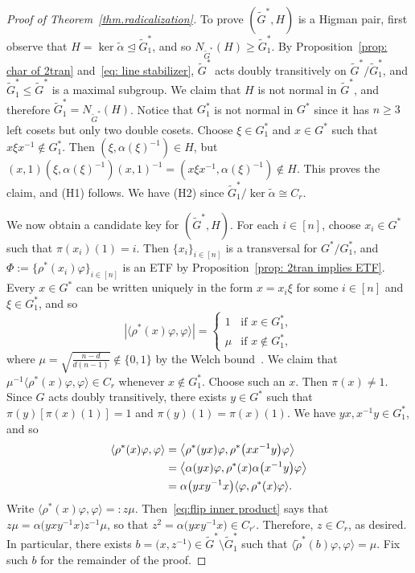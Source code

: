 \begin{proof}[Proof of Theorem~\ref{thm.radicalization}]
To prove $(\widetilde{G}^*, H)$ is a Higman pair, first observe that $H = \ker \widetilde{\alpha} \trianglelefteq \widetilde{G}_1^*$, and so $N_{\widetilde{G}^*}(H) \geq \widetilde{G}_1^*$.
By Proposition~\ref{prop: char of 2tran} and~\eqref{eq: line stabilizer}, $\widetilde{G}^*$ acts doubly transitively on $\widetilde{G}^*/\widetilde{G}_1^*$, and $\widetilde{G}_1^*\leq \widetilde{G}^*$ is a maximal subgroup.
We claim that $H$ is not normal in $\widetilde{G}^*$, and therefore $\widetilde{G}_1^* = N_{\widetilde{G}^*}(H)$.
Notice that $G_1^*$ is not normal in $G^*$ since it has $n\geq 3$ left cosets but only two double cosets.
Choose $\xi \in G_1^*$ and $x \in G^*$ such that $x\xi x^{-1} \notin G_1^*$.
Then $(\xi,\alpha(\xi)^{-1}) \in H$, but $(x,1)(\xi,\alpha(\xi)^{-1})(x,1)^{-1} = (x\xi x^{-1},\alpha(\xi)^{-1}) \notin H$.
This proves the claim, and (H1) follows.
We have (H2) since $\widetilde{G}_1^*/\ker \widetilde{\alpha} \cong C_r$.

We now obtain a candidate key for $(\widetilde{G}^*, H)$.
For each $i \in [n]$, choose $x_i \in G^*$ such that $\pi(x_i)(1) = i$.
Then $\{ x_i \}_{i \in [n]}$ is a transversal for $G^* / G_1^*$, and $\Phi := \{ \rho^*(x_i) \varphi \}_{i\in [n]}$ is an ETF by Proposition~\ref{prop: 2tran implies ETF}.
Every $x \in G^*$ can be written uniquely in the form $x = x_i \xi$ for some $i \in [n]$ and $\xi \in G_1^*$, and so
\begin{equation}
\label{eq: phi levels}
| \langle \rho^*(x) \varphi, \varphi \rangle | = \begin{cases}
1 & \text{if }x \in G_1^*, \\
\mu & \text{if }x \notin G_1^*,
\end{cases}
\end{equation}
where $\mu = \sqrt{\frac{n-d}{d(n-1)}} \notin \{0,1\}$ by the Welch bound~\cite{Welch:74}.
We claim that $\mu^{-1} \langle \rho^*(x) \varphi, \varphi \rangle \in C_r$ whenever $x \notin G_1^*$.
Choose such an $x$.
Then $\pi(x) \neq 1$.
Since $G$ acts doubly transitively, there exists $y \in G^*$ such that $\pi(y)[\pi(x)(1)] = 1$ and $\pi(y)(1) = \pi(x)(1)$.
We have $yx,x^{-1}y \in G_1^*$, and so
\begin{align}
\label{eq:flip inner product}
\langle \rho^*(x) \varphi, \varphi \rangle 
&= \bigl\langle \rho^*(yx) \varphi, \rho^*\bigl(xx^{-1}y\bigr) \varphi \bigr\rangle \\ \notag
&= \bigl\langle \alpha(yx) \varphi, \rho^*(x) \alpha\bigl(x^{-1} y \bigr) \varphi \bigr\rangle \\ \notag
&= \alpha\bigl(yxy^{-1}x\bigr) \langle \varphi, \rho^*(x) \varphi \rangle.
\end{align}
Write $\langle \rho^*(x) \varphi, \varphi \rangle =: z \mu$.
Then~\eqref{eq:flip inner product} says that $z \mu = \alpha\bigl(yxy^{-1}x\bigr) z^{-1} \mu$, so that $z^2 = \alpha\bigl(yxy^{-1}x\bigr) \in C_{r'}$.
Therefore, $z \in C_r$, as desired.
In particular, there exists $b = \bigl(x,z^{-1}\bigr) \in \widetilde{G}^* \setminus \widetilde{G}_1^*$ such that $\langle \tilde{\rho}^*(b) \varphi, \varphi \rangle = \mu$.
Fix such $b$ for the remainder of the proof.


\end{proof}
